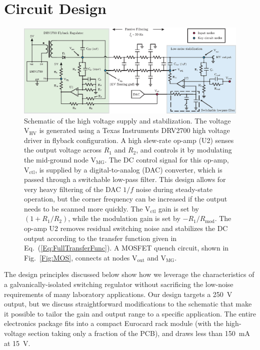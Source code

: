 \documentclass[aip,rsi,reprint]{revtex4-1} %
\begin{document}
\section{Circuit Design}
\label{Sec:Circuit}

\begin{figure}[t]
\includegraphics[width=\textwidth]{Schematic}
\caption{Schematic of the high voltage supply and stabilization.
The voltage $\text{V}_\text{HV}$ is generated using a Texas Instruments DRV2700 high voltage driver in flyback configuration.
A high slew-rate op-amp (U2) senses the output voltage across $R_1$ and $R_2$, and controls it by modulating the mid-ground node $\text{V}_\text{MG}$.
The DC control signal for this op-amp,  $\text{V}_{\text{ctl}}$, is supplied by a digital-to-analog (DAC) converter, which is passed through a switchable low-pass filter. 
This design allows for very heavy filtering of the DAC $1/f$ noise during steady-state operation, but the corner frequency can be increased if the output needs to be scanned more quickly.
The $\text{V}_{\text{ctl}}$ gain is set by $\left(1+R_1/R_2\right)$, while the modulation gain is set by $-R_1/R_\text{mod}$.
The op-amp U2 removes residual switching noise and stabilizes the DC output according to the transfer function given in Eq.~(\ref{Eq:FullTransferFunc}).
A MOSFET quench circuit, shown in Fig.~\ref{Fig:MOS}, connects at nodes $\text{V}_\text{out}$ and $\text{V}_\text{MG}$.
\label{Fig:PiezoCircuit}}
\end{figure}


The design principles discussed below show how we leverage the characteristics of a galvanically-isolated switching regulator without sacrificing the low-noise requirements of many laboratory applications.
Our design targets a \SI{250}{\volt} output, but we discuss straightforward modifications to the schematic that make it possible to tailor the gain and output range to a specific application.
The entire electronics package fits into a compact Eurocard rack module (with the high-voltage section taking only a fraction of the PCB), and draws less than \SI{150}{\milli\ampere} at \SI{15}{\volt}.
\end{document}
